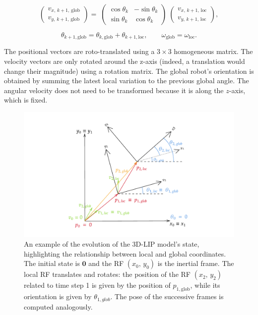 \documentclass[main.tex]{subfiles}
\begin{document}
$$
\begin{pmatrix} v_{x,\,k+1,\,\text{glob} } \\ v_{y,\,k+1,\,\text{glob}}\end{pmatrix} = \; \begin{pmatrix} \cos\theta_k & -\sin\theta_k \\ \sin\theta_k & \cos\theta_k \end{pmatrix}\;
\begin{pmatrix}
v_{x,\,k+1,\,\text{loc} } \\ v_{y,\,k+1,\,\text{loc}}
\end{pmatrix},
$$

$$ 
\theta_{k+1, \text{glob}} = \theta_{k, \text{glob}} + \theta_{k+1, \text{loc}},
\qquad
\omega_{\text{glob}} = \omega_{\text{loc}}.
$$

The positional vectors are roto-translated using a $3\times3$ homogeneous matrix. The velocity vectors are only rotated around the z-axis (indeed, a translation would change their magnitude) using a rotation matrix. The global robot's orientation is obtained by summing the latest local variation to the previous global angle. The angular velocity does not need to be transformed because it is along the $z$-axis, which is fixed.

\begin{figure}[h]
    \centering
    \includegraphics[width=1\linewidth]{figures/LIP/loc_to_glob_tfm.pdf}
    \caption{An example of the evolution of the 3D-LIP model's state, highlighting the relationship between local and global coordinates. The initial state is $\mathbf{0}$ and the RF $(x_0,\, y_0)$ is the inertial frame. The local RF translates and rotates: the position of the RF $(x_2,\, y_2)$ related to time step 1 is given by the position of $p_{1, \text{glob}}$, while its orientation is given by $\theta_{1, glob}$. The pose of the successive frames is computed analogously.}
    \label{fig:loc_to_glob_tfm}
\end{figure}
\end{document}
